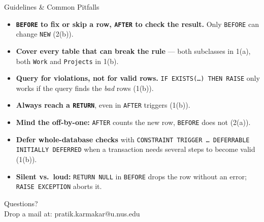 \documentclass{beamer}
\begin{document}
\begin{frame}{Guidelines \& Common Pitfalls}
\footnotesize
\begin{itemize}\itemsep2pt
  \item \textbf{\texttt{BEFORE} to fix or skip a row, \texttt{AFTER} to check the result.} Only \texttt{BEFORE} can change \texttt{NEW} (2(b)).
  \item \textbf{Cover every table that can break the rule} --- both subclasses in 1(a), both \texttt{Work} and \texttt{Projects} in 1(b).
  \item \textbf{Query for violations, not for valid rows.} \texttt{IF EXISTS(\ldots) THEN RAISE} only works if the query finds the \emph{bad} rows (1(b)).
  \item \textbf{Always reach a \texttt{RETURN}}, even in \texttt{AFTER} triggers (1(b)).
  \item \textbf{Mind the off-by-one:} \texttt{AFTER} counts the new row, \texttt{BEFORE} does not (2(a)).
  \item \textbf{Defer whole-database checks} with \texttt{CONSTRAINT TRIGGER \ldots\ DEFERRABLE INITIALLY DEFERRED} when a transaction needs several steps to become valid (1(b)).
  \item \textbf{Silent vs.\ loud:} \texttt{RETURN NULL} in \texttt{BEFORE} drops the row without an error; \texttt{RAISE EXCEPTION} aborts it.
\end{itemize}
\end{frame}

\begin{frame}
\begin{center}
Questions?\\
Drop a mail at: pratik.karmakar@u.nus.edu
\end{center}
\end{frame}
\end{document}
